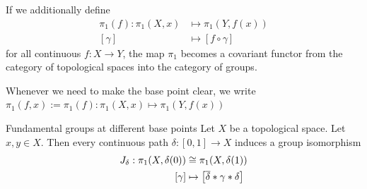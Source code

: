 \begin{theorem}
	If we additionally define
	\begin{align*}
		\pi_1(f) : \pi_1(X,x) &\mapsto \pi_1(Y,f(x))\\
		[\gamma] &\mapsto [f \circ \gamma]
	\end{align*}
	for all continuous $f : X \to Y$, 
	the map $\pi_1$ becomes a covariant functor from the category of topological spaces into the category of groups.
\end{theorem}
\begin{definition}
	Whenever we need to make the base point clear, we write $\pi_1(f,x) := \pi_1(f) : \pi_1(X,x) \mapsto \pi_1(Y,f(x))$
\end{definition}
\begin{importanttheorem}{Fundamental groups at different base points}{}
	Let $X$ be a topological space. Let $x,y \in X$. Then every continuous path $\delta : [0,1] \to X$ induces a group isomorphism
	\begin{align*}
		J_\delta : \pi_1(X, \delta(0)) &\cong \pi_1(X,\delta(1))\\
		[\gamma] &\mapsto \qty[\overline{{\delta}} * \gamma * \delta]
	\end{align*}
\end{importanttheorem}
